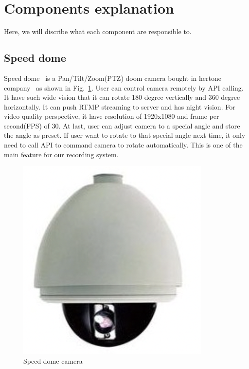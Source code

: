 \section{Components explanation}
Here, we will discribe what each component are responsible to.
\subsection{Speed dome}
Speed dome~\cite{speed-dome} is a Pan/Tilt/Zoom(PTZ) doom camera bought in hertone company~\cite{hertone-LTD} as shown in Fig.~\ref{fig:speeddome}. User can control camera remotely by API calling. It have such wide vision that it can rotate 180 degree vertically and 360 degree horizontally. It can push RTMP streaming to server and has night vision. For video quality perspective, it have resolution of 1920x1080 and frame per second(FPS) of 30. At last, user can adjust camera to a special angle and store the angle as preset. If user want to rotate to that special angle next time, it only need to call API to command camera to rotate automatically. This is one of the main feature for our recording system.
\begin{figure}[H]
    \centering
    \includegraphics[width=\textwidth / 3]{figsrc/speeddome.png}
    \caption{Speed dome camera\label{fig:speeddome}}
\end{figure}

